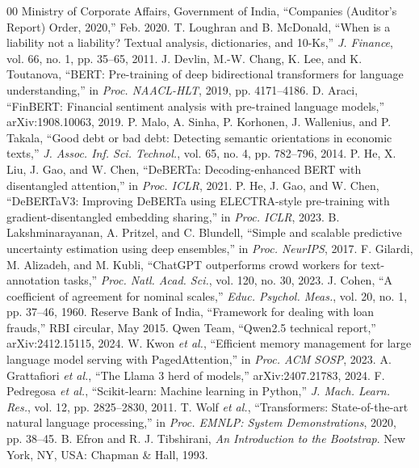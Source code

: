 \documentclass[conference]{IEEEtran}
\begin{document}
\begin{thebibliography}{00}
 Ministry of Corporate Affairs, Government of India, ``Companies (Auditor's Report) Order, 2020,'' Feb. 2020.
 T. Loughran and B. McDonald, ``When is a liability not a liability? Textual analysis, dictionaries, and 10-Ks,'' \emph{J. Finance}, vol. 66, no. 1, pp. 35--65, 2011.
 J. Devlin, M.-W. Chang, K. Lee, and K. Toutanova, ``BERT: Pre-training of deep bidirectional transformers for language understanding,'' in \emph{Proc. NAACL-HLT}, 2019, pp. 4171--4186.
 D. Araci, ``FinBERT: Financial sentiment analysis with pre-trained language models,'' arXiv:1908.10063, 2019.
 P. Malo, A. Sinha, P. Korhonen, J. Wallenius, and P. Takala, ``Good debt or bad debt: Detecting semantic orientations in economic texts,'' \emph{J. Assoc. Inf. Sci. Technol.}, vol. 65, no. 4, pp. 782--796, 2014.
 P. He, X. Liu, J. Gao, and W. Chen, ``DeBERTa: Decoding-enhanced BERT with disentangled attention,'' in \emph{Proc. ICLR}, 2021.
 P. He, J. Gao, and W. Chen, ``DeBERTaV3: Improving DeBERTa using ELECTRA-style pre-training with gradient-disentangled embedding sharing,'' in \emph{Proc. ICLR}, 2023.
 B. Lakshminarayanan, A. Pritzel, and C. Blundell, ``Simple and scalable predictive uncertainty estimation using deep ensembles,'' in \emph{Proc. NeurIPS}, 2017.
 F. Gilardi, M. Alizadeh, and M. Kubli, ``ChatGPT outperforms crowd workers for text-annotation tasks,'' \emph{Proc. Natl. Acad. Sci.}, vol. 120, no. 30, 2023.
 J. Cohen, ``A coefficient of agreement for nominal scales,'' \emph{Educ. Psychol. Meas.}, vol. 20, no. 1, pp. 37--46, 1960.
 Reserve Bank of India, ``Framework for dealing with loan frauds,'' RBI circular, May 2015.
 Qwen Team, ``Qwen2.5 technical report,'' arXiv:2412.15115, 2024.
 W. Kwon \emph{et al.}, ``Efficient memory management for large language model serving with PagedAttention,'' in \emph{Proc. ACM SOSP}, 2023.
 A. Grattafiori \emph{et al.}, ``The Llama 3 herd of models,'' arXiv:2407.21783, 2024.
 F. Pedregosa \emph{et al.}, ``Scikit-learn: Machine learning in Python,'' \emph{J. Mach. Learn. Res.}, vol. 12, pp. 2825--2830, 2011.
 T. Wolf \emph{et al.}, ``Transformers: State-of-the-art natural language processing,'' in \emph{Proc. EMNLP: System Demonstrations}, 2020, pp. 38--45.
 B. Efron and R. J. Tibshirani, \emph{An Introduction to the Bootstrap}. New York, NY, USA: Chapman \& Hall, 1993.
\end{thebibliography}
\end{document}

